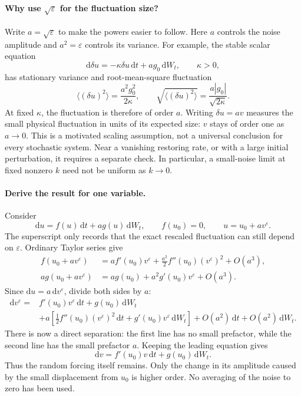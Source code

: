 \documentclass{article}
\begin{document}
\paragraph{Why use $\sqrt{\varepsilon}$ for the fluctuation size?}
Write $a=\sqrt{\varepsilon}$ to make the powers easier to follow. Here $a$ controls the noise amplitude and $a^2=\varepsilon$ controls its variance. For example, the stable scalar equation
\begin{equation}
    \mathrm d\delta u=-\kappa\delta u\,\mathrm dt+a g_0\,\mathrm dW_t,
    \qquad \kappa>0,
\end{equation}
has stationary variance and root-mean-square fluctuation
\begin{equation}
    \langle(\delta u)^2\rangle=\frac{a^2g_0^2}{2\kappa},\qquad
    \sqrt{\langle(\delta u)^2\rangle}=\frac{a|g_0|}{\sqrt{2\kappa}}.
\end{equation}
At fixed $\kappa$, the fluctuation is therefore of order $a$. Writing $\delta u=a v$ measures the small physical fluctuation in units of its expected size: $v$ stays of order one as $a\to0$. This is a motivated scaling assumption, not a universal conclusion for every stochastic system. Near a vanishing restoring rate, or with a large initial perturbation, it requires a separate check. In particular, a small-noise limit at fixed nonzero $k$ need not be uniform as $k\to0$.

\paragraph{Derive the result for one variable.}
Consider
\begin{equation}
    \mathrm du=f(u)\,\mathrm dt+a g(u)\,\mathrm dW_t,\qquad f(u_0)=0,
    \qquad u=u_0+a v^\varepsilon.
\end{equation}
The superscript only records that the exact rescaled fluctuation can still depend on $\varepsilon$. Ordinary Taylor series give
\begin{align}
    f(u_0+a v^\varepsilon)
    &=a f'(u_0)v^\varepsilon+\frac{a^2}{2}f''(u_0)(v^\varepsilon)^2+O(a^3),\\
    a g(u_0+a v^\varepsilon)
    &=a g(u_0)+a^2 g'(u_0)v^\varepsilon+O(a^3).
\end{align}
Since $\mathrm du=a\,\mathrm dv^\varepsilon$, divide both sides by $a$:
\begin{align}
    \mathrm dv^\varepsilon={}&f'(u_0)v^\varepsilon\,\mathrm dt+g(u_0)\,\mathrm dW_t\nonumber\\
    &+a\left[\frac12f''(u_0)(v^\varepsilon)^2\,\mathrm dt
    +g'(u_0)v^\varepsilon\,\mathrm dW_t\right]
    +O(a^2)\,\mathrm dt+O(a^2)\,\mathrm dW_t.
    \label{eq:appElementaryScalar}
\end{align}
There is now a direct separation: the first line has no small prefactor, while the second line has the small prefactor $a$. Keeping the leading equation gives
\begin{equation}
    \boxed{\mathrm dv=f'(u_0)v\,\mathrm dt+g(u_0)\,\mathrm dW_t.}
\end{equation}
Thus the random forcing itself remains. Only the change in its amplitude caused by the small displacement from $u_0$ is higher order. No averaging of the noise to zero has been used.
\end{document}
